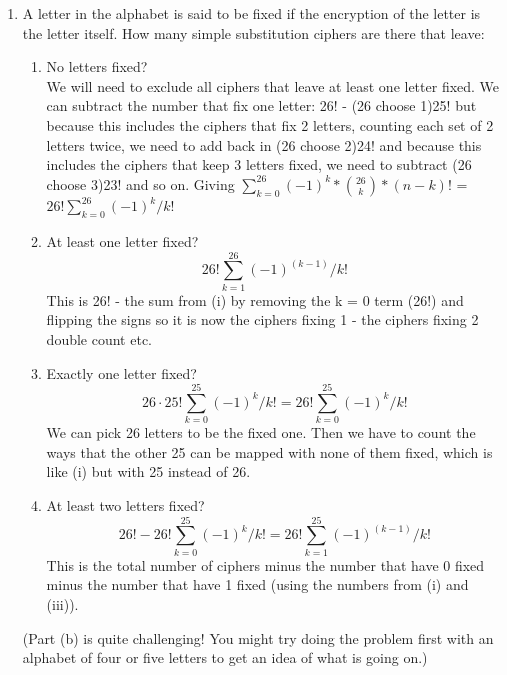 \documentclass[12pt]{amsart}
\theoremstyle{definition}
\begin{document}
\begin{enumerate}
\begin{enumerate}
			\item  A letter in the alphabet is said to be fixed if the encryption of the letter is the
				letter itself. How many simple substitution ciphers are there that leave:
		
			\begin{enumerate}
				\item No letters fixed? 
				\\ We will need to exclude all ciphers that leave at least one letter fixed. We can subtract the number that fix one letter: 26! - (26 choose 1)25! 
				but because this includes the ciphers that fix 2 letters, counting each set of 2 letters twice, we need to add back in (26 choose 2)24! and because this includes
				the ciphers that keep 3 letters fixed, we need to subtract (26 choose 3)23! and so on. 
				Giving $\sum_{k=0}^{26}{(-1)^k * {26 \choose k}*(n-k)!}$ = $26!\sum_{k=0}^{26}{(-1)^k/ k!}$

				\item At least one letter fixed?  $$26!\sum_{k=1}^{26}{(-1)^{(k-1)}/k!}$$
				This is 26! - the sum from (i) by removing the k = 0 term (26!) and flipping the signs so it is now the ciphers fixing 1 - the ciphers fixing 2 double count etc. \\
				\item Exactly one letter fixed?
				$$26 \cdot 25!\sum_{k=0}^{25}{(-1)^k/ k!} = 26!\sum_{k=0}^{25}{(-1)^k/ k!}$$
				We can pick 26 letters to be the fixed one. Then we have to count the ways that the other 25 can be mapped with none of them fixed, which is like (i) but with 25 instead of 26.\\
				\item At least two letters fixed?
				$$26!- 26!\sum_{k=0}^{25}{(-1)^k/ k!} = 26!\sum_{k=1}^{25}{(-1)^{(k-1)}/ k!}$$
				This is the total number of ciphers minus the number that have 0 fixed minus the number that have 1 fixed (using the numbers from (i) and (iii)).\\
				
			\end{enumerate}
			(Part (b) is quite challenging! You might try doing the problem first with an alphabet 
			of four or five letters to get an idea of what is going on.)
		\end{enumerate}
\end{enumerate}
\end{document}
